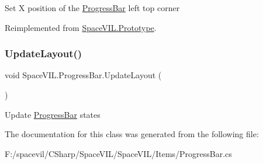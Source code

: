 Set X position of the \mbox{\hyperlink{class_space_v_i_l_1_1_progress_bar}{Progress\+Bar}} left top corner 



Reimplemented from \mbox{\hyperlink{class_space_v_i_l_1_1_prototype}{Space\+V\+I\+L.\+Prototype}}.

\mbox{\label{class_space_v_i_l_1_1_progress_bar_a210b9b1fb096d851fcbc1aa34872f389}} 
\subsubsection{\texorpdfstring{Update\+Layout()}{UpdateLayout()}}
{\footnotesize\ttfamily void Space\+V\+I\+L.\+Progress\+Bar.\+Update\+Layout (\begin{DoxyParamCaption}{ }\end{DoxyParamCaption})\hspace{0.3cm}{\ttfamily [inline]}}



Update \mbox{\hyperlink{class_space_v_i_l_1_1_progress_bar}{Progress\+Bar}} states 



The documentation for this class was generated from the following file\+:\begin{DoxyCompactItemize}
\item 
F\+:/spacevil/\+C\+Sharp/\+Space\+V\+I\+L/\+Space\+V\+I\+L/\+Items/Progress\+Bar.\+cs\end{DoxyCompactItemize}
